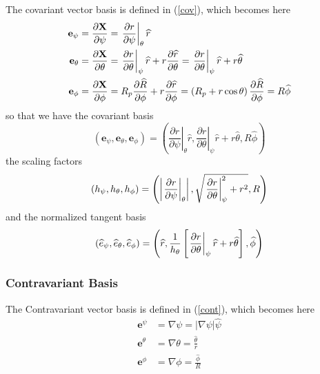 The covariant vector basis is defined in (\ref{cov}), which becomes here 
\begin{align}
\mathbf{e}_{\psi} & =\frac{\partial\mathbf{X}}{\partial\psi}=\left. \frac{%
\partial r}{\partial\psi}\right| _{\theta}\widehat{r} \\
\mathbf{e}_{\theta} & =\frac{\partial\mathbf{X}}{\partial\theta}=\left. 
\frac{\partial r}{\partial\theta}\right| _{\psi}\widehat{r}+r\frac {\partial%
\widehat{r}}{\partial\theta}=\left. \frac{\partial r}{\partial \theta}%
\right| _{\psi}\widehat{r}+r\widehat{\theta} \\
\mathbf{e}_{\phi} & =\frac{\partial\mathbf{X}}{\partial\phi}=R_{p}\frac{%
\partial\widehat{R}}{\partial\phi}+r\frac{\partial\widehat{r}}{\partial\phi}%
=\left( R_{p}+r\cos\theta\right) \frac{\partial\widehat{R}}{\partial\phi}=R%
\widehat{\phi}
\end{align}
so that we have the covariant basis 
\begin{equation}
\left( \mathbf{e}_{\psi},\mathbf{e}_{\theta},\mathbf{e}_{\phi}\right)
=\left( \left. \frac{\partial r}{\partial\psi}\right| _{\theta}\widehat {r}%
,\left. \frac{\partial r}{\partial\theta}\right| _{\psi}\widehat {r}+r%
\widehat{\theta},R\widehat{\phi}\right)  \label{covpsit}
\end{equation}
the scaling factors 
\begin{equation}
\left( h_{\psi},h_{\theta},h_{\phi}\right) =\left( \left| \left. \frac{%
\partial r}{\partial\psi}\right| _{\theta}\right| ,\sqrt{\left. \frac{%
\partial r}{\partial\theta}\right| _{\psi}^{2}+r^{2}},R\right)
\end{equation}
and the normalized tangent basis 
\begin{equation}
\left( \widehat{e}_{\psi},\widehat{e}_{\theta},\widehat{e}_{\phi}\right)
=\left( \widehat{r},\frac{1}{h_{\theta}}\left[ \left. \frac{\partial r}{%
\partial\theta}\right| _{\psi}\widehat{r}+r\widehat{\theta}\right] ,\widehat{%
\phi}\right)
\end{equation}

\subsubsection{Contravariant Basis}

The Contravariant vector basis is defined in (\ref{cont}), which becomes
here 
\begin{align}
\mathbf{e}^{\psi} & =\nabla\psi=\left| \nabla\psi\right| \widehat{\psi} \\
\mathbf{e}^{\theta} & =\nabla\theta=\frac{\widehat{\theta}}{r} \\
\mathbf{e}^{\phi} & =\nabla\phi=\frac{\widehat{\phi}}{R}
\end{align}

